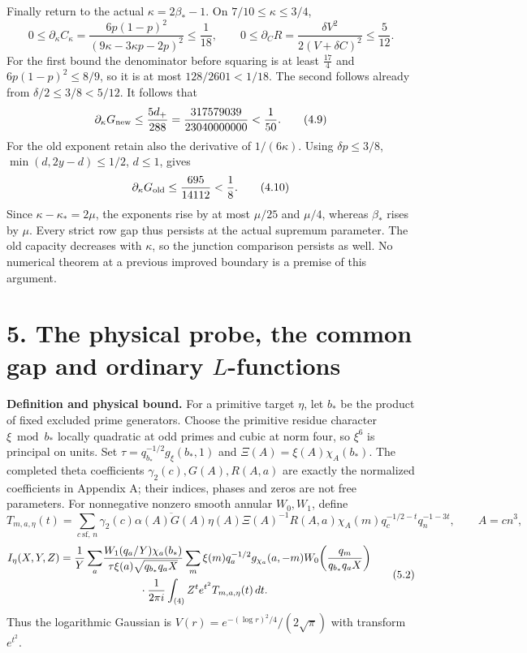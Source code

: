 \documentclass[11pt,a4paper]{article}
\begin{document}
Finally return to the actual \(\kappa=2\beta_*-1\). On
\(7/10\le\kappa\le3/4\), \[
0\le\partial_\kappa C_\kappa
=\frac{6p(1-p)^2}{(9\kappa-3\kappa p-2p)^2}\le\frac1{18},
\qquad
0\le\partial_C R=\frac{\delta V^2}{2(V+\delta C)^2}\le\frac5{12}.
\tag{4.8}
\] For the first bound the denominator before squaring is at least
\(\frac{17}{4}\) and \(6p(1-p)^2\le8/9\), so it is at most \(128/2601<1/18\).
The second follows already from \(\delta/2\le3/8<5/12\). It follows that
\[
\partial_\kappa G_{\rm new}
\le\frac{5d_+}{288}
=\frac{317579039}{23040000000}<\frac1{50}.
\tag{4.9}
\] For the old exponent retain also the derivative of \(1/(6\kappa)\).
Using \(\delta p\le3/8\), \(\min(d,2y-d)\le1/2\), \(d\le1\), gives \[
\partial_\kappa G_{\rm old}\le\frac{695}{14112}<\frac18.
\tag{4.10}
\] Since \(\kappa-\kappa_*=2\mu\), the exponents rise by at most
\(\mu/25\) and \(\mu/4\), whereas \(\beta_*\) rises by \(\mu\). Every
strict row gap thus persists at the actual supremum parameter. The old
capacity decreases with \(\kappa\), so the junction comparison persists
as well. No numerical theorem at a previous improved boundary is a
premise of this argument.

\hypertarget{the-physical-probe-the-common-gap-and-ordinary-l-functions}{%
\section{\texorpdfstring{5. The physical probe, the common gap and
ordinary
\(L\)-functions}{5. The physical probe, the common gap and ordinary L-functions}}\label{the-physical-probe-the-common-gap-and-ordinary-l-functions}}

\textbf{Definition and physical bound.} For a primitive target \(\eta\),
let \(b_*\) be the product of fixed excluded prime generators. Choose
the primitive residue character \(\xi\bmod b_*\) locally quadratic at
odd primes and cubic at norm four, so \(\xi^6\) is principal on units.
Set \(\tau=q_{b_*}^{-1/2}g_\xi(b_*,1)\) and
\(\Xi(A)=\xi(A)\chi_A(b_*)\). The completed theta coefficients
\(\gamma_2(c),G(A),R(A,a)\) are exactly the normalized coefficients in
Appendix A; their indices, phases and zeros are not free parameters. For
nonnegative nonzero smooth annular \(W_0,W_1\), define \[
T_{m,a,\eta}(t)=\sum_{c\ \mathrm{sf},\,n}
 \gamma_2(c)\overline{\alpha(A)G(A)}\eta(A)\Xi(A)^{-1}
 R(A,a)\chi_A(m)q_c^{-1/2-t}q_n^{-1-3t},\qquad A=cn^3,
\tag{5.1}
\] \[
\begin{split}
I_\eta(X,Y,Z)=\frac1Y\sum_a&
 \frac{W_1(q_a/Y)\chi_a(b_*)}{\tau\xi(a)\sqrt{q_{b_*}q_aX}}
 \sum_m\xi(m)q_a^{-1/2}g_{\chi_a}(a,-m)
 W_0\!\left(\frac{q_m}{q_{b_*}q_aX}\right)\\
&\hspace{12mm}\cdot\frac1{2\pi i}
 \int_{(4)}Z^t e^{t^2}T_{m,a,\eta}(t)\,dt.
\end{split}
\tag{5.2}
\] Thus the logarithmic Gaussian is
\(V(r)=e^{-(\log r)^2/4}/(2\sqrt\pi)\) with transform \(e^{t^2}\).
\end{document}
